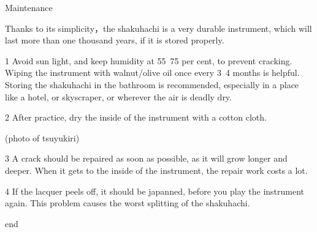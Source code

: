 ﻿Maintenance

Thanks to its simplicity，the shakuhachi is a very durable instrument, which will last more than one thousand years, if it is stored properly. 

1  Avoid sun light, and keep humidity at 55~75 per cent, to prevent cracking.
   Wiping the instrument with walnut/olive oil once every 3~4 months is helpful.
   Storing the shakuhachi in the bathroom is recommended, especially in a place like a hotel, or skyscraper, or wherever the air is deadly dry. 

2  After practice, dry the inside of the instrument with a cotton cloth.
               
   (photo of tsuyukiri) 

3  A crack should be repaired as soon as possible, as it will grow longer and deeper.
   When it gets to the inside of the instrument, the repair work costs a lot.

4  If the lacquer peels off, it should be japanned, before you play the 
   instrument again. This problem causes the worst splitting of the shakuhachi.


                                  end




	
